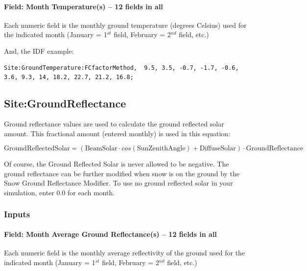 \paragraph{Field: Month Temperature(s) -- 12 fields in all}\label{field-month-temperatures-12-fields-in-all-3}

Each numeric field is the monthly ground temperature (degrees Celsius) used for the indicated month (January = 1\(^{st}\) field, February = 2\(^{nd}\) field, etc.)

And, the IDF example:

\begin{lstlisting}
Site:GroundTemperature:FCfactorMethod,  9.5, 3.5, -0.7, -1.7, -0.6, 3.6, 9.3, 14, 18.2, 22.7, 21.2, 16.8;
\end{lstlisting}

\subsection{Site:GroundReflectance}\label{sitegroundreflectance}

Ground reflectance values are used to calculate the ground reflected solar amount. This fractional amount (entered monthly) is used in this equation:

\begin{equation}
\mathrm{GroundReflectedSolar} = \left( \mathrm{BeamSolar} \cdot cos \left( \mathrm{SunZenithAngle} \right) + \mathrm{DiffuseSolar} \right) \cdot \mathrm{GroundReflectance}
\end{equation}

Of course, the Ground Reflected Solar is never allowed to be negative. The ground reflectance can be further modified when snow is on the ground by the Snow Ground Reflectance Modifier. To use no ground reflected solar in your simulation, enter 0.0 for each month.

\subsubsection{Inputs}\label{inputs-19-003}

\paragraph{Field: Month Average Ground Reflectance(s) -- 12 fields in all}\label{field-month-average-ground-reflectances-12-fields-in-all}

Each numeric field is the monthly average reflectivity of the ground used for the indicated month (January = 1\(^{st}\) field, February = 2\(^{nd}\) field, etc.)

